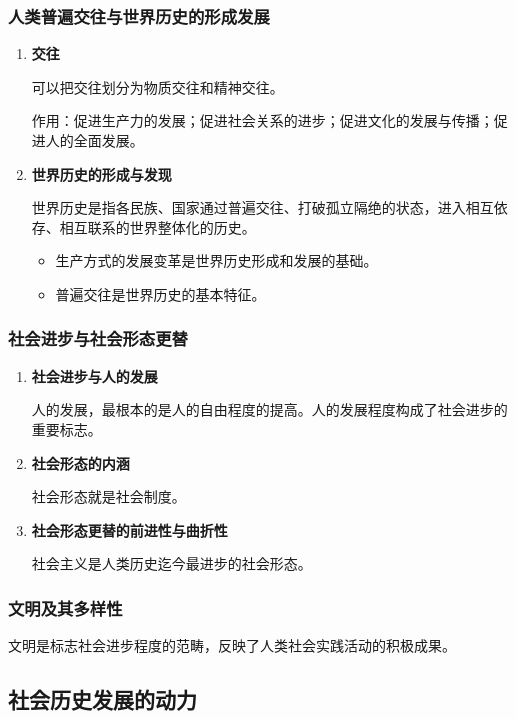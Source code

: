 \documentclass[12pt, a4paper, oneside]{ctexart}
\begin{document}
\subsubsection{人类普遍交往与世界历史的形成发展}

\begin{enumerate}
  \item {\bf 交往}
  
  可以把交往划分为物质交往和精神交往。

  作用：促进生产力的发展；促进社会关系的进步；促进文化的发展与传播；促进人的全面发展。

  \item {\bf 世界历史的形成与发现}
  
  世界历史是指各民族、国家通过普遍交往、打破孤立隔绝的状态，进入相互依存、相互联系的世界整体化的历史。

  \begin{itemize}
    \item 生产方式的发展变革是世界历史形成和发展的基础。
    \item 普遍交往是世界历史的基本特征。
  \end{itemize}
\end{enumerate}

\subsubsection{社会进步与社会形态更替}

\begin{enumerate}
  \item {\bf 社会进步与人的发展}
  
  人的发展，最根本的是人的自由程度的提高。人的发展程度构成了社会进步的重要标志。

  \item {\bf 社会形态的内涵}
  
  社会形态就是社会制度。

  \item {\bf 社会形态更替的前进性与曲折性}
  
  社会主义是人类历史迄今最进步的社会形态。
\end{enumerate}

\subsubsection{文明及其多样性}

文明是标志社会进步程度的范畴，反映了人类社会实践活动的积极成果。

\subsection{社会历史发展的动力}
\end{document}
